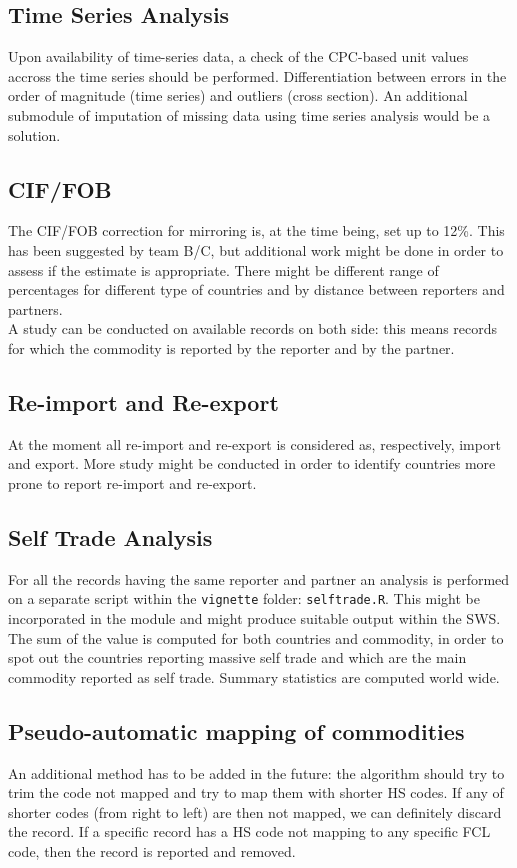 \documentclass[nojss]{jss}\usepackage[]{graphicx}\usepackage[]{color}
\begin{document}
\subsection{Time Series Analysis}
Upon availability of time-series data, a check of the CPC-based unit values accross the time series should be performed. Differentiation between errors in the order of magnitude (time series) and outliers (cross section). An additional submodule of imputation of missing data using time series analysis would be a solution.

\subsection{CIF/FOB}
The CIF/FOB correction for mirroring is, at the time being, set up to 12\%. This has been suggested by team B/C, but additional work might be done in order to assess if the estimate is appropriate. There might be different range of percentages for different type of countries and by distance between reporters and partners.\\
A study can be conducted on available records on both side: this means records for which the commodity is reported by the reporter and by the partner.

\subsection{Re-import and Re-export}
At the moment all re-import and re-export is considered as, respectively, import and export. More study might be conducted in order to identify countries more prone to report re-import and re-export.

\subsection{Self Trade Analysis}
For all the records having the same reporter and partner an analysis is performed on a separate script within the {\tt vignette} folder: {\tt selftrade.R}. This might be incorporated in the module and might produce suitable output within the SWS.\\
The sum of the value is computed for both countries and commodity, in order to spot out the countries reporting massive self trade and which are the main commodity reported as self trade. Summary statistics are computed world wide.

\subsection{Pseudo-automatic mapping of commodities}
An additional method has to be added in the future: the algorithm should try to trim the code not mapped and try to map them with shorter HS codes. If any of shorter codes (from right to left) are then not mapped, we can definitely discard the record.
If a specific record has a HS code not mapping to any specific FCL code, then the record is reported and removed.
\end{document}
